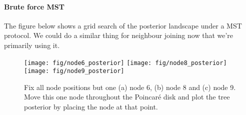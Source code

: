 \documentclass[11pt, twocolumn]{article}
\begin{document}

\paragraph{Brute force MST}
The figure below shows a grid search of the posterior landscape under a MST protocol.
We could do a similar thing for neighbour joining now that we're primarily using it.
\begin{figure}[htbp]
\begin{center}
\texttt{[image: fig/node6\_posterior]}%
\texttt{[image: fig/node8\_posterior]}%
\texttt{[image: fig/node9\_posterior]}
\end{center}
\caption{Fix all node positions but one (a) node 6, (b) node 8 and (c) node 9. Move this one node throughout the Poincaré disk and plot the tree posterior by placing the node at that point.}
\end{figure}
    
\end{document}

